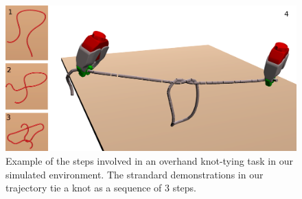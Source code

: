 \begin{figure}
  \includegraphics[width=\linewidth]{figs/cov.png}
  \caption{Example of the steps involved in an overhand knot-tying task in our simulated
           environment. The strandard demonstrations in our trajectory tie a knot as a 
           sequence of 3 steps.}
  \label{fig:knot_steps}
\end{figure}



